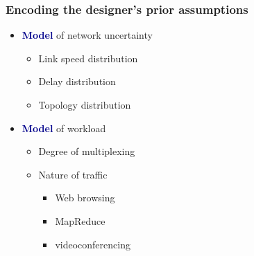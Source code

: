 \documentclass[svgnames]{beamer}
\begin{document}
\begin{frame}
\frametitle{Encoding the designer's prior assumptions}

\begin{itemize}

\Large

\item \textcolor{DarkBlue}{\bf Model} of network uncertainty

\begin{itemize}
\item Link speed distribution
\item Delay distribution
\item Topology distribution
\end{itemize}

\item \textcolor{DarkBlue}{\bf Model} of workload

\begin{itemize}
\item Degree of multiplexing

\item Nature of traffic
\begin{itemize}
\item Web browsing
\item MapReduce
\item videoconferencing
\end{itemize}
\end{itemize}

\end{itemize}

\end{frame}
\end{document}
